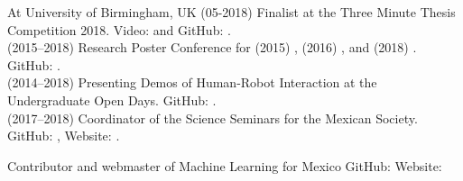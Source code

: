 \documentclass[10pt,a4paper,roman]{moderncv}
\begin{document}
{At University of Birmingham, UK}
{}{}{}
{
(05-2018) Finalist at the Three Minute Thesis Competition 2018.
Video: \href{https://www.youtube.com/watch?v=07ewRYcS-0g}{\faYoutube} and 
GitHub: \href{https://github.com/mxochicale/3mt}{\faGithubAlt}. \\  
(2015--2018) Research Poster Conference for 
(2015) \href{https://github.com/mxochicale/PhD/blob/master/posters/Research_Poster_Conference_UoB/2015/poster/poster.pdf}{\faImage}, 
(2016) \href{https://github.com/mxochicale/PhD/blob/master/posters/Research_Poster_Conference_UoB/2016/poster/poster.pdf}{\faImage}, and  
(2018) \href{https://github.com/mxochicale/PhD/blob/master/posters/Research_Poster_Conference_UoB/2018/poster/main/map479-poster-uob2018.pdf}{\faImage}.
GitHub: \href{https://github.com/mxochicale/PhD/tree/master/posters/Research_Poster_Conference_UoB}{\faGithubAlt}. \\
(2014--2018) Presenting Demos of Human-Robot Interaction at the Undergraduate Open Days.
GitHub: \href{https://github.com/mxochicale/opendayuob-hridemo}{\faGithubAlt}. \\ 
(2017--2018) Coordinator of the Science Seminars for the Mexican Society. 
GitHub: \href{https://github.com/MexicanSocietyUoB}{\faGithubAlt}, 
Website: \href{https://mexicansocietyuob.github.io/seminars/}{\faExternalLink}. \\ 
}

{Contributor and webmaster of Machine Learning for Mexico}
{}
{GitHub: \href{https://github.com/ML4MX}{\faGithubAlt} }
{Website: \href{https://ml4mx.github.io/website/}{\faExternalLink}}
{}  %






%
\end{document}
